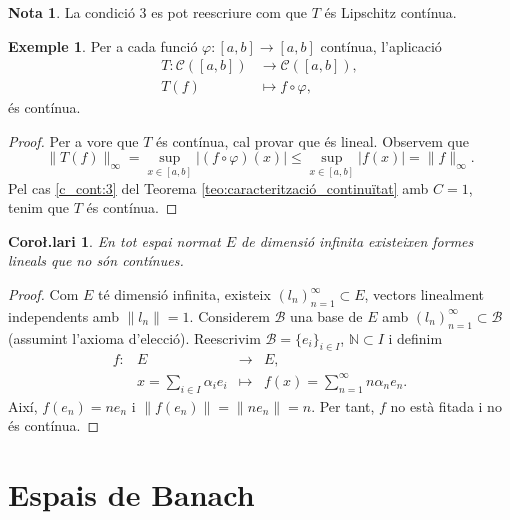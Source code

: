\documentclass[12pt]{book}
\newtheorem{coro}[teorema]{Coro\l.lari}
\theoremstyle{definition}
\theoremstyle{nota}
\newtheorem*{nota*}{Nota}
\theoremstyle{exemple}
\newtheorem{exemple}[teorema]{Exemple}
\begin{document}
\begin{nota*}
  La condició 3 es pot reescriure com que $T$ és Lipschitz contínua.
\end{nota*}

\begin{exemple}
  Per a cada funció $\varphi : [a,b] \to [a,b]$ contínua, l'aplicació
  \begin{align*}
    T : \mathcal C([a,b]) &\longrightarrow \mathcal C([a,b]), \\
    T (f) &\longmapsto f \circ \varphi, 
  \end{align*}
  és contínua.
\end{exemple}

\begin{proof}
  Per a vore que $T$ és contínua, cal provar que és lineal. Observem
  que
  \[
    \|T(f)\|_\infty = \sup_{x\in[a,b]} \left|(f\circ\varphi)(x)\right|
    \leq \sup_{x\in[a,b]}|f(x)| = \|f\|_\infty.
  \]
  Pel cas \ref{c_cont:3} del Teorema
  \ref{teo:caracterització_continuïtat} amb $C=1$, tenim que $T$ és
  contínua.
\end{proof}

\begin{coro}
  En tot espai normat $E$ de dimensió infinita existeixen formes
  lineals que no són contínues.
\end{coro}

\begin{proof}
  Com $E$ té dimensió infinita, existeix
  $(l_n)_{n=1}^\infty \subset E$, vectors linealment independents amb
  $\|l_n\| = 1$. Considerem $\mathcal{B}$ una base de $E$ amb
  $(l_n)_{n=1}^\infty \subset \mathcal{B}$ (assumint l'axioma
  d'elecció). Reescrivim $\mathcal{B} = \{e_i\}_{i \in I}$,
  $\mathbb{N} \subset I$ i definim
  \begin{equation*}
    \begin{array}{lrcl}
      f : & E &\longrightarrow& E, \\
          & x = \sum\limits_{i \in I}\alpha_ie_i
              &\longmapsto& f(x) = \sum\limits_{n=1}^{\infty} n\alpha_ne_n.
    \end{array}
  \end{equation*}
  Així, $f(e_n) = ne_n$ i $\|f(e_n)\| = \|ne_n\| = n$. Per tant, $f$
  no està fitada i no és contínua.
\end{proof}

\section{Espais de Banach}
\end{document}

